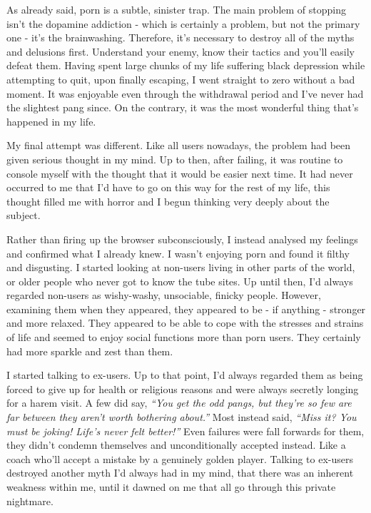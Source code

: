 \documentclass[
]{book}
\begin{document}
As already said, porn is a subtle, sinister trap. The main problem of stopping isn't the dopamine addiction - which is certainly a problem, but not the primary one - it's the brainwashing. Therefore, it's necessary to destroy all of the myths and delusions first. Understand your enemy, know their tactics and you'll easily defeat them. Having spent large chunks of my life suffering black depression while attempting to quit, upon finally escaping, I went straight to zero without a bad moment. It was enjoyable even through the withdrawal period and I've never had the slightest pang since. On the contrary, it was the most wonderful thing that's happened in my life.

My final attempt was different. Like all users nowadays, the problem had been given serious thought in my mind. Up to then, after failing, it was routine to console myself with the thought that it would be easier next time. It had never occurred to me that I'd have to go on this way for the rest of my life, this thought filled me with horror and I begun thinking very deeply about the subject.

Rather than firing up the browser subconsciously, I instead analysed my feelings and confirmed what I already knew. I wasn't enjoying porn and found it filthy and disgusting. I started looking at non-users living in other parts of the world, or older people who never got to know the tube sites. Up until then, I'd always regarded non-users as wishy-washy, unsociable, finicky people. However, examining them when they appeared, they appeared to be - if anything - stronger and more relaxed. They appeared to be able to cope with the stresses and strains of life and seemed to enjoy social functions more than porn users. They certainly had more sparkle and zest than them.

I started talking to ex-users. Up to that point, I'd always regarded them as being forced to give up for health or religious reasons and were always secretly longing for a harem visit. A few did say, \emph{``You get the odd pangs, but they're so few are far between they aren't worth bothering about.''} Most instead said, \emph{``Miss it? You must be joking! Life's never felt better!''} Even failures were fall forwards for them, they didn't condemn themselves and unconditionally accepted instead. Like a coach who'll accept a mistake by a genuinely golden player. Talking to ex-users destroyed another myth I'd always had in my mind, that there was an inherent weakness within me, until it dawned on me that all go through this private nightmare.
\end{document}
